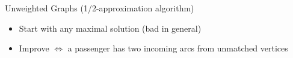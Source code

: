 \begin{frame}{Unweighted Graphs (1/2-approximation algorithm)}
\begin{itemize}
  \item<1-3> Start with any maximal solution (bad in general)
  \item<4> Improve $\iff$ a passenger has two incoming arcs from unmatched
  vertices
\end{itemize}
\centering

\end{frame}